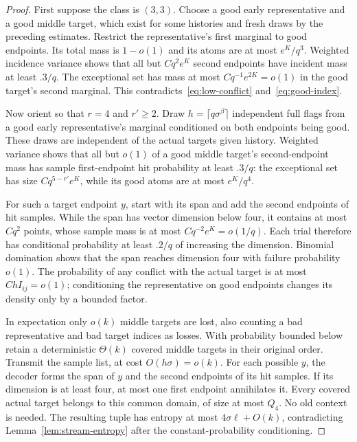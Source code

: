 \begin{proof}
First suppose the class is $(3,3)$.  Choose a good early representative
and a good middle target, which exist for some histories and fresh draws
by the preceding estimates.  Restrict the representative's first
marginal to good endpoints.  Its total mass is $1-o(1)$ and its atoms
are at most $e^K/q^3$.  Weighted incidence variance shows that all but
$Cq^2e^K$ second endpoints have incident mass at least $.3/q$.
The exceptional set has mass at most $Cq^{-1}e^{2K}=o(1)$ in the good
target's second marginal.  This contradicts~\eqref{eq:low-conflict}
and~\eqref{eq:good-index}.

Now orient so that $r=4$ and $r'\ge2$.  Draw
$h=\lceil q\sigma^\beta\rceil$ independent full flags from a good
early representative's marginal conditioned on both endpoints being
good.  These draws are independent of the actual targets given history.
Weighted variance shows that all but $o(1)$ of a good middle target's
second-endpoint mass has sample first-endpoint hit probability at least
$.3/q$: the exceptional set has size $Cq^{5-r'}e^K$, while its good
atoms are at most $e^K/q^4$.

For such a target endpoint $y$, start with its span and add the second
endpoints of hit samples.  While the span has vector dimension below
four, it contains at most $Cq^2$ points, whose sample mass is at most
$Cq^{-2}e^K=o(1/q)$.  Each trial therefore has conditional probability
at least $.2/q$ of increasing the dimension.  Binomial domination shows
that the span reaches dimension four with failure probability $o(1)$.
The probability of any conflict with the actual target is at most
$ChI_{ij}=o(1)$; conditioning the representative on good endpoints
changes its density only by a bounded factor.

In expectation only $o(k)$ middle targets are lost, also counting a bad
representative and bad target indices as losses.  With probability
bounded below retain a deterministic $\Theta(k)$ covered middle targets
in their original order.  Transmit the sample list, at cost
$O(h\sigma)=o(k)$.  For each possible $y$, the decoder forms the span
of $y$ and the second endpoints of its hit samples.  If its dimension
is at least four, at most one first endpoint annihilates it.  Every
covered actual target belongs to this common domain, of size at most
$Q_4$.  No old context is needed.  The resulting tuple has entropy at
most $4\sigma\ell+O(k)$, contradicting Lemma~\ref{lem:stream-entropy}
after the constant-probability conditioning.
\end{proof}

